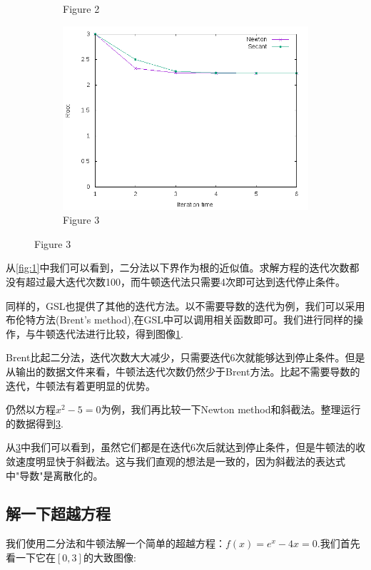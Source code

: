 \documentclass{ctexart}
\begin{document}
\begin{figure}[H]
\begin{subfigure}{0.3\linewidth}
  \caption{Figure 2}
  \label{fig:2}
  \end{subfigure}
  \begin{subfigure}{0.3\linewidth}
  \centering
  \includegraphics[width=1\textwidth]{graph3.png}
  \caption{Figure 3}
  \label{fig:3}
  \end{subfigure}
\end{figure}

从\ref{fig:1}中我们可以看到，二分法以下界作为根的近似值。求解方程的迭代次数都没有超过最大迭代次数100，而牛顿迭代法只需要4次即可达到迭代停止条件。

同样的，GSL也提供了其他的迭代方法\cite{gslref}。以不需要导数的迭代为例，我们可以采用布伦特方法(Brent's method),在GSL中可以调用相关函数即可。我们进行同样的操作，与牛顿迭代法进行比较，得到图像\ref{fig:2}.

Brent比起二分法，迭代次数大大减少，只需要迭代6次就能够达到停止条件。但是从输出的数据文件来看，牛顿法迭代次数仍然少于Brent方法。比起不需要导数的迭代，牛顿法有着更明显的优势。

仍然以方程$x^2-5=0$为例，我们再比较一下Newton method和斜截法。整理运行的数据得到\ref{fig:3}.

从\ref{fig:3}中我们可以看到，虽然它们都是在迭代6次后就达到停止条件，但是牛顿法的收敛速度明显快于斜截法。这与我们直观的想法是一致的，因为斜截法的表达式中"导数"是离散化的。

\subsection{解一下超越方程}
我们使用二分法和牛顿法解一个简单的超越方程：$f(x)=e^x-4x=0$.我们首先看一下它在$[0,3]$的大致图像:
\end{document}
